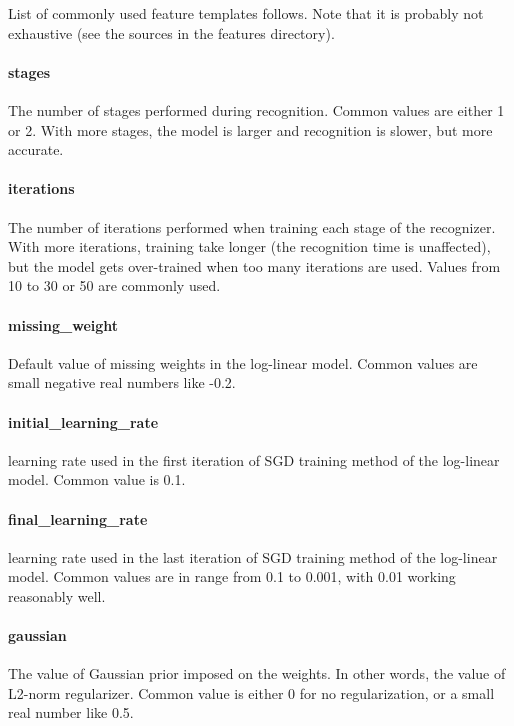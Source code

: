 List of commonly used feature templates follows. Note that it is probably not
exhaustive (see the sources in the features directory).


\paragraph{stages}
The number of stages performed during recognition. Common values are either 1 or
2. With more stages, the model is larger and recognition is slower, but more accurate.

\paragraph{iterations}
The number of iterations performed when training each stage of the recognizer.
With more iterations, training take longer (the recognition time is unaffected),
but the model gets over-trained when too many iterations are used. Values from 10
to 30 or 50 are commonly used.

\paragraph{missing\_weight}
Default value of missing weights in the log-linear model. Common values are small
negative real numbers like -0.2.

\paragraph{initial\_learning\_rate}
learning rate used in the first iteration of SGD training method of the log-linear
model. Common value is 0.1.

\paragraph{final\_learning\_rate}
learning rate used in the last iteration of SGD training method of the log-linear
model. Common values are in range from 0.1 to 0.001, with 0.01 working reasonably well.

\paragraph{gaussian}
The value of Gaussian prior imposed on the weights. In other words, the value of
L2-norm regularizer. Common value is either 0 for no regularization, or a small
real number like 0.5.

